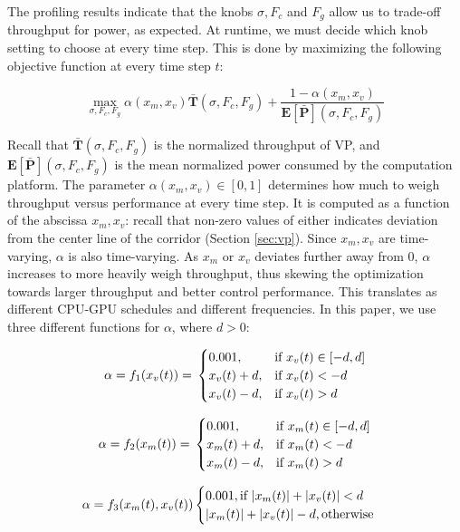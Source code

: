
The profiling results indicate that the knobs $\sigma, F_c$ and $F_g$ allow us to trade-off throughput for power, as expected.
At runtime, we must decide which knob setting to choose at every time step. 
This is done by maximizing the following objective function at every time step $t$:

\begin{equation}
\max_{\sigma,F_{c},F_{g}} \alpha(x_m,x_v)\mathbf{\bar{T}}(\sigma,F_{c},F_{g}) + \frac{1-\alpha(x_m,x_v)}{\mathbf{E[\bar{P}]}(\sigma,F_{c},F_{g})}
\label{eq:cost_runtime}
\end{equation}

Recall that $\mathbf{\bar{T}}(\sigma,F_{c},F_{g})$ is the normalized throughput of VP, and $\mathbf{E[\bar{P}]}(\sigma,F_{c},F_{g})$ is the mean normalized power consumed by the computation platform.
The parameter $\alpha(x_m,x_v) \in [0,1]$ determines how much to weigh throughput versus performance at every time step. 
It is computed as a function of the abscissa $x_m,x_v$: recall that non-zero values of either indicates deviation from the center line of the corridor (Section \ref{sec:vp}). 
Since $x_m,x_v$ are time-varying, $\alpha$ is also time-varying.
As $x_m$ or $x_v$ deviates further away from 0, $\alpha$ increases to more heavily weigh throughput, thus skewing the optimization towards larger throughput and better control performance.
This translates as different CPU-GPU schedules and different frequencies.
In this paper, we use three different functions for $\alpha$, where $d >0$:

{\footnotesize{
		\begin{equation}
		\alpha= f_1(x_v(t)) = \\
		\begin{cases}
		0.001,&\text{if }x_v(t)\in[-d,d]\\
		x_v(t)+d,&\text{if }x_v(t)<-d\\
		x_v(t)-d,&\text{if }x_v(t)>d
		\end{cases}
		\label{eq:f1}
		\end{equation}
	}}
	
	{\footnotesize{
			\begin{equation}
			\alpha = f_2(x_m(t)) = \\
			\begin{cases}
			0.001,&\text{if }x_m(t)\in[-d,d]\\
			x_m(t)+d,&\text{if }x_m(t)<-d\\
			x_m(t)-d,&\text{if }x_m(t)>d
			\end{cases}
			\label{eq:f2}
			\end{equation}
		}}
		
{\footnotesize{
		\begin{equation}
		\alpha = f_3(x_m(t),x_v(t)) \\
		\begin{cases}
		0.001,\text{if }|x_m(t)|+|x_v(t)|<d\\
		|x_m(t)|+|x_v(t)|-d,\text{otherwise}\\
		\end{cases}
		\label{eq:f3}
		\end{equation}
	}}